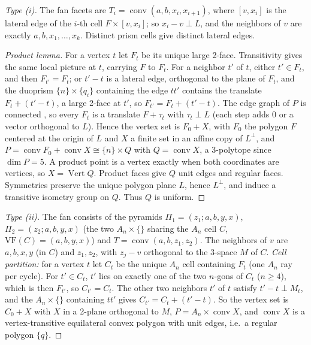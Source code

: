\documentclass[11pt]{article}
\theoremstyle{definition}
\theoremstyle{remark}
\newcommand{\VF}{\mathrm{VF}}
\newcommand{\conv}{\operatorname{conv}}
\begin{document}
\begin{proof}[Type (i)]
The fan facets are $T_i=\conv(a,b,x_i,x_{i+1})$, where $[v,x_i]$ is the
lateral edge of the $i$-th cell $F\times[v,x_i]$; so $x_i-v\perp L$, and the
neighbors of $v$ are exactly $a,b,x_1,\dots,x_k$. Distinct prism cells give distinct lateral edges.

\emph{Product lemma.} For a vertex $t$ let $F_t$ be its unique large
2-face. Transitivity gives the same local picture at $t$, carrying $F$ to $F_t$. For a
neighbor $t'$ of $t$, either $t'\in F_t$, and then $F_{t'}=F_t$; or $t'-t$
is a lateral edge, orthogonal to the plane of $F_t$, and the duoprism
$\{n\}\times\{q_i\}$ containing the edge $tt'$ contains the translate
$F_t+(t'-t)$, a large 2-face at $t'$, so $F_{t'}=F_t+(t'-t)$. The edge graph of $P$ is connected
\cite{Balinski1961}, so every $F_t$ is a translate $F+\tau_t$ with
$\tau_t\perp L$ (each step adds $0$ or a vector orthogonal to $L$).
Hence the vertex set is $F_0+X$, with $F_0$ the polygon $F$ centered at the
origin of $L$ and $X$ a finite set in an affine copy of $L^\perp$, and
$P=\conv F_0+\conv X\cong\{n\}\times Q$ with $Q=\conv X$, a 3-polytope since
$\dim P=5$. A product point is a vertex exactly when both coordinates are vertices, so $X=\operatorname{Vert}Q$. Product faces give $Q$ unit edges and regular faces. Symmetries preserve the unique polygon plane $L$, hence $L^\perp$, and induce a transitive isometry group on $Q$. Thus $Q$ is uniform.
\end{proof}

\begin{proof}[Type (ii)]
The fan consists of the pyramids $\Pi_1=(z_1;a,b,y,x)$,
$\Pi_2=(z_2;a,b,y,x)$ (the two $A_n\times\{\}$ sharing the $A_n$ cell $C$,
$\VF(C)=(a,b,y,x)$) and $T=\conv(a,b,z_1,z_2)$. The neighbors of $v$ are
$a,b,x,y$ (in $C$) and $z_1,z_2$, with $z_j-v$ orthogonal to the
3-space $M$ of $C$. \emph{Cell partition:} for a vertex $t$ let $C_t$ be
the unique $A_n$ cell containing $F_t$ (one $A_n$ ray per cycle). For
$t'\in C_t$, $t'$ lies on exactly one of the two $n$-gons of $C_t$ ($n\ge4$),
which is then $F_{t'}$, so $C_{t'}=C_t$. The other two neighbors $t'$ of
$t$ satisfy $t'-t\perp M_t$, and the $A_n\times\{\}$ containing $tt'$ gives
$C_{t'}=C_t+(t'-t)$. So the vertex set is $C_0+X$ with $X$ in a 2-plane
orthogonal to $M$, $P=A_n\times\conv X$, and $\conv X$ is a
vertex-transitive equilateral convex polygon with unit edges, i.e.\ a
regular polygon $\{q\}$.
\end{proof}
\end{document}

